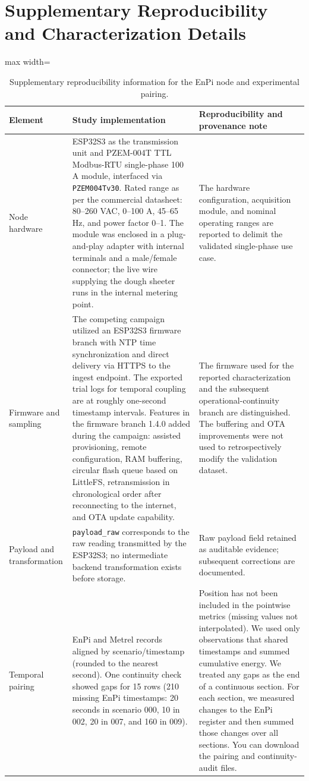 \documentclass[technologies,article,submit,pdftex,moreauthors]{Definitions/mdpi}
\begin{document}
\section{Supplementary Reproducibility and Characterization Details}
\begin{table}[H]
\caption{Supplementary reproducibility information for the EnPi node and experimental pairing.}
\label{tab:S3}
\centering
\scriptsize
\begin{adjustbox}{max width=\textwidth}
\begin{tabular}{p{}p{}p{}}
\toprule
Element & Study implementation & Reproducibility and provenance note \\
\midrule
Node hardware & ESP32S3 as the transmission unit and PZEM-004T TTL Modbus-RTU single-phase 100 A module, interfaced via \texttt{PZEM004Tv30}. Rated range as per the commercial datasheet: 80--260 VAC, 0--100 A, 45--65 Hz, and power factor 0--1. The module was enclosed in a plug-and-play adapter with internal terminals and a male/female connector; the live wire supplying the dough sheeter runs in the internal metering point.  & The hardware configuration, acquisition module, and nominal operating ranges are reported to delimit the validated single-phase use case. \\
Firmware and sampling & The competing campaign utilized an ESP32S3 firmware branch with NTP time synchronization and direct delivery via HTTPS to the ingest endpoint. The exported trial logs for temporal coupling are at roughly one-second timestamp intervals. Features in the firmware branch 1.4.0 added during the campaign: assisted provisioning, remote configuration, RAM buffering, circular flash queue based on LittleFS, retransmission in chronological order after reconnecting to the internet, and OTA update capability. & The firmware used for the reported characterization and the subsequent operational-continuity branch are distinguished. The buffering and OTA improvements were not used to retrospectively modify the validation dataset. \\
Payload and transformation & \texttt{payload\_raw} corresponds to the raw reading transmitted by the ESP32S3; no intermediate backend transformation exists before storage. & Raw payload field retained as auditable evidence; subsequent corrections are documented. \\
Temporal pairing & EnPi and Metrel records aligned by scenario/timestamp (rounded to the nearest second). One continuity check showed gaps for 15 rows (210 missing EnPi timestamps: 20 seconds in scenario 000, 10 in 002, 20 in 007, and 160 in 009). & Position has not been included in the pointwise metrics (missing values not interpolated). We used only observations that shared timestamps and summed cumulative energy. We treated any gaps as the end of a continuous section. For each section, we measured changes to the EnPi register and then summed those changes over all sections. You can download the pairing and continuity-audit files. \\

\end{tabular}
\end{adjustbox}
\end{table}
\end{document}
